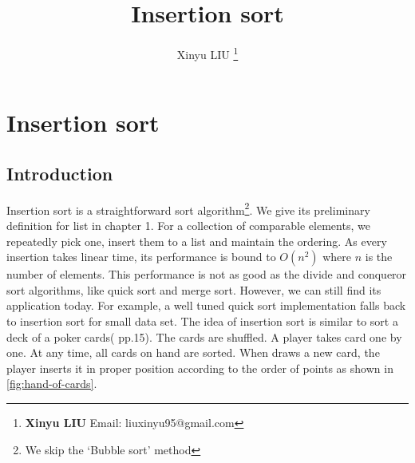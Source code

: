 \documentclass[b5paper]{article}
\begin{document}
\title{Insertion sort}

\author{Xinyu LIU
\thanks{{\bfseries Xinyu LIU} \newline
  Email: liuxinyu95@gmail.com \newline}
  }

\maketitle
\fi


\ifx\wholebook\relax
\chapter{Insertion sort}
\fi

\section{Introduction}
\label{sec:isort-introduction} 

\lstset{frame = single}
Insertion sort is a straightforward sort algorithm\footnote{We skip the `Bubble sort' method}. We give its preliminary definition for list in chapter 1. For a collection of comparable elements, we repeatedly pick one, insert them to a list and maintain the ordering. As every insertion takes linear time, its performance is bound to $O(n^2)$ where $n$ is the number of elements. This performance is not as good as the divide and conqueror sort algorithms, like quick sort and merge sort. However, we can still find its application today. For example, a well tuned quick sort implementation falls back to insertion sort for small data set. The idea of insertion sort is similar to sort a deck of a poker cards(\cite{CLRS} pp.15). The cards are shuffled. A player takes card one by one. At any time, all cards on hand are sorted. When draws a new card, the player inserts it in proper position according to the order of points as shown in \cref{fig:hand-of-cards}.
\end{document}

